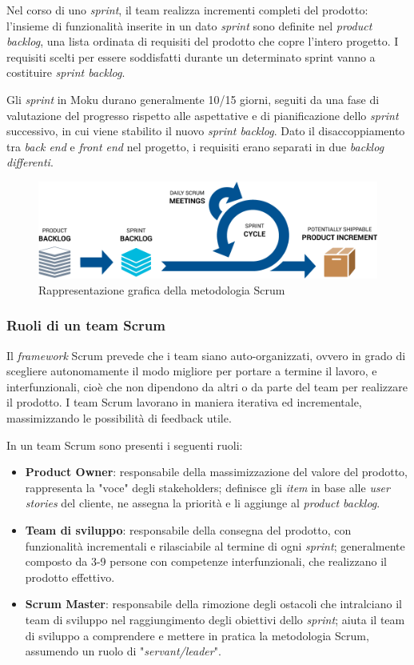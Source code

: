 Nel corso di uno \textit{sprint}, il team realizza incrementi completi del prodotto: l'insieme di funzionalità inserite in un dato \textit{sprint} sono definite nel \textit{product backlog}, una lista ordinata di requisiti del prodotto che copre l'intero progetto. I requisiti scelti per essere soddisfatti durante un determinato sprint vanno a costituire \textit{sprint backlog}.

Gli \textit{sprint} in Moku durano generalmente 10/15 giorni, seguiti da una fase di valutazione del progresso rispetto alle aspettative e di pianificazione dello \textit{sprint} successivo, in cui viene stabilito il nuovo \textit{sprint backlog}. Dato il disaccoppiamento tra \textit{back end} e \textit{front end} nel progetto, i requisiti erano separati in due \textit{backlog differenti}.

\begin{figure}[h!]
    \includegraphics[width=\textwidth]{figures/agile-development-process.png}
    \caption[Scrum]{Rappresentazione grafica della metodologia Scrum
    \label{fig:scrum}}
\end{figure}    

\subsubsection{Ruoli di un team Scrum}
\indent Il \textit{framework} Scrum prevede che i team siano auto-organizzati, ovvero in grado di scegliere autonomamente il modo migliore per portare a termine il lavoro, e interfunzionali, cioè che non dipendono da altri o da parte del team per realizzare il prodotto. I team Scrum lavorano in maniera iterativa ed incrementale, massimizzando le possibilità di feedback utile. 

In un team Scrum sono presenti i seguenti ruoli:
\begin{itemize}
    \item \textbf{Product Owner}: responsabile della massimizzazione del valore del prodotto, rappresenta la "voce" degli stakeholders; definisce gli \textit{item} in base alle \textit{user stories} del cliente, ne assegna la priorità e li aggiunge al \textit{product backlog}.
    \item \textbf{Team di sviluppo}: responsabile della consegna del prodotto, con funzionalità incrementali e rilasciabile al termine di ogni \textit{sprint}; generalmente composto da 3-9 persone con competenze interfunzionali, che realizzano il prodotto effettivo.
    \item \textbf{Scrum Master}: responsabile della rimozione degli ostacoli che intralciano il team di sviluppo nel raggiungimento degli obiettivi dello \textit{sprint}; aiuta il team di sviluppo a comprendere e mettere in pratica la metodologia Scrum, assumendo un ruolo di "\textit{servant/leader}".
\end{itemize}

